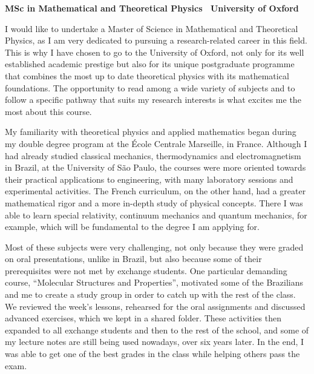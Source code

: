 \documentclass[11pt]{article}
\newcommand*{\NEWLINE}{\vspace{0.75em}}
\begin{document}
\sffamily %

{\bfseries MSc in Mathematical and Theoretical Physics \textemdash~University of Oxford}
\NEWLINE{}\NEWLINE{}

I would like to undertake a Master of Science in Mathematical and Theoretical Physics, as I am very dedicated to pursuing a research-related career in this field. This is why I have chosen to go to the University of Oxford, not only for its well established academic prestige but also for its unique postgraduate programme that combines the most up to date theoretical physics with its mathematical foundations. The opportunity to read among a wide variety of subjects and to follow a specific pathway that suits my research interests is what excites me the most about this course. \NEWLINE{}

My familiarity with theoretical physics and applied mathematics began during my double degree program at the École Centrale Marseille, in France. Although I had already studied classical mechanics, thermodynamics and electromagnetism in Brazil, at the University of São Paulo, the courses were more oriented towards their practical applications to engineering, with many laboratory sessions and experimental activities. The French curriculum, on the other hand, had a greater mathematical rigor and a more in-depth study of physical concepts. There I was able to learn special relativity, continuum mechanics and quantum mechanics, for example, which will be fundamental to the degree I am applying for. \NEWLINE{}

Most of these subjects were very challenging, not only because they were graded on oral presentations, unlike in Brazil, but also because some of their prerequisites were not met by exchange students. One particular demanding course, ``Molecular Structures and Properties'', motivated some of the Brazilians and me to create a study group in order to catch up with the rest of the class. We reviewed the week's lessons, rehearsed for the oral assignments and discussed advanced exercises, which we kept in a shared folder. These activities then expanded to all exchange students and then to the rest of the school, and some of my lecture notes are still being used nowadays, over six years later. In the end, I was able to get one of the best grades in the class while helping others pass the exam. \NEWLINE{}
\end{document}

